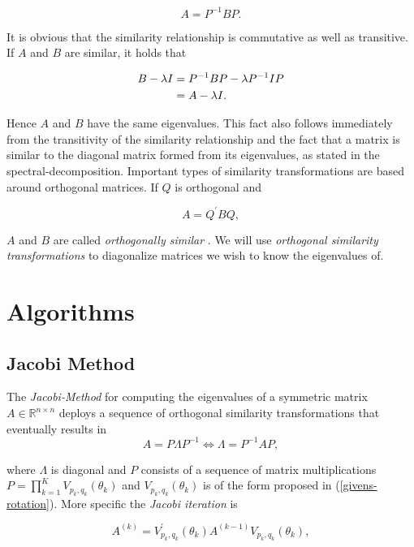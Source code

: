 \documentclass[12pt]{article}
\begin{document}
\begin{equation}
\label{similarity}
A = P^{-1} B P.
\end{equation}

It is obvious that the similarity relationship is commutative as well as transitive. If $A$ and $B$ are similar, it holds that

\begin{align*}
B - \lambda I &= P^{-1} B P - \lambda P^{-1} I P \notag \\
              &= A - \lambda I.
\end{align*}

 Hence $A$ and $B$ have the same eigenvalues. This fact also follows immediately from the transitivity of the similarity relationship and the fact that a matrix is similar to the diagonal matrix formed from its eigenvalues, as stated in the spectral-decomposition. Important types of similarity transformations are based around orthogonal matrices. If $Q$ is orthogonal and
 
$$ A = Q^{\prime} B Q, $$

$A$ and $B$ are called \textit{orthogonally similar} \cite{NLA}. We will use \textit{orthogonal similarity transformations} to diagonalize matrices we wish to know the eigenvalues of. 

\section{Algorithms}
\subsection{Jacobi Method}

The \textit{Jacobi-Method} for computing the eigenvalues of a symmetric matrix $A \in \mathbb{R}^{n \times n}$ deploys a sequence of orthogonal similarity transformations that eventually results in
$$ A = P \Lambda P^{-1} \Leftrightarrow \Lambda = P^{-1} A P,$$

where $\Lambda$ is diagonal and $P$ consists of a sequence of matrix multiplications $P = \prod\limits_{k=1}^{K} V_{p_k, q_k}(\theta_k)$ and $V_{p_k, q_k}(\theta_k)$ is of the form proposed in (\ref{givens-rotation}). More specific the \textit{Jacobi iteration} is

\begin{equation}
A^{(k)} = V^{\prime}_{p_k, q_k}(\theta_k) A^{(k-1)} V_{p_k, q_k}(\theta_k),
\end{equation}
\end{document}
